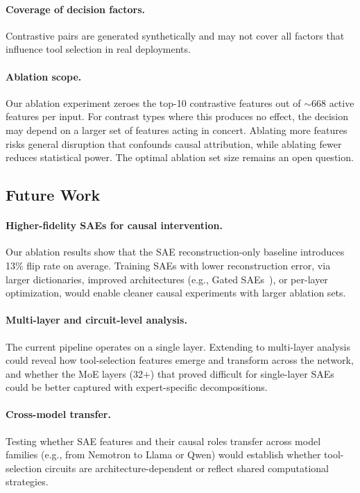 \documentclass[runningheads]{llncs}
\begin{document}
\paragraph{Coverage of decision factors.} Contrastive pairs are generated synthetically and may not cover all factors that influence tool selection in real deployments.

\paragraph{Ablation scope.} Our ablation experiment zeroes the top-10 contrastive features out of ${\sim}668$ active features per input. For contrast types where this produces no effect, the decision may depend on a larger set of features acting in concert. Ablating more features risks general disruption that confounds causal attribution, while ablating fewer reduces statistical power. The optimal ablation set size remains an open question.

\subsection{Future Work}

\paragraph{Higher-fidelity SAEs for causal intervention.} Our ablation results show that the SAE reconstruction-only baseline introduces 13\% flip rate on average. Training SAEs with lower reconstruction error, via larger dictionaries, improved architectures (e.g., Gated SAEs~\cite{rajamanoharan2024improvingdictionarylearninggated}), or per-layer optimization, would enable cleaner causal experiments with larger ablation sets.

\paragraph{Multi-layer and circuit-level analysis.} The current pipeline operates on a single layer. Extending to multi-layer analysis could reveal how tool-selection features emerge and transform across the network, and whether the MoE layers (32+) that proved difficult for single-layer SAEs could be better captured with expert-specific decompositions.

\paragraph{Cross-model transfer.} Testing whether SAE features and their causal roles transfer across model families (e.g., from Nemotron to Llama or Qwen) would establish whether tool-selection circuits are architecture-dependent or reflect shared computational strategies.
\end{document}

